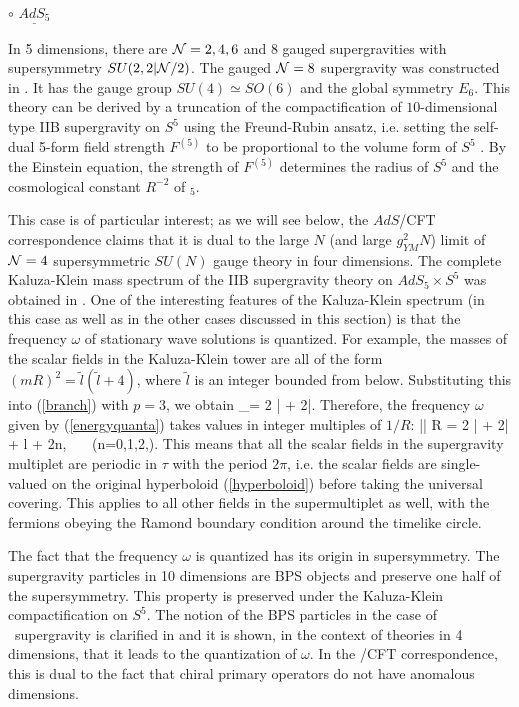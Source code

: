 \medskip
\noindent
$\circ$ $\underline{AdS_5}$

In 5 dimensions, there are ${\cal N} = 2,4,6$ and $8$ gauged
supergravities with supersymmetry $SU(2,2|{\cal N}/2)$.
The gauged ${\cal N}=8$ supergravity was constructed 
in \cite{Pernici:1985ju,Gunaydin:1986cu}. 
It has the gauge group $SU(4) \simeq SO(6)$ and
the global symmetry $E_6$. 
This theory can be
derived by a truncation of the
compactification of $10$-dimensional type IIB
supergravity on $S^5$ using the Freund-Rubin ansatz, i.e.
setting the self-dual 5-form field strength $F^{(5)}$ 
to be proportional to the volume form of $S^5$
\cite{Schwarz:1983qr,Gunaydin:1985fk,Kim:1985ez}. By the Einstein equation,
the strength of $F^{(5)}$ determines the radius of $S^5$
and the cosmological constant $R^{-2}$ of \ads$_5$.

This case is of particular interest; as we will see below,
the $AdS$/CFT correspondence claims that 
it is dual to the large $N$ (and large $g_{YM}^2 N$) limit of 
${\cal N}=4$ supersymmetric $SU(N)$ gauge theory in four dimensions. 
The complete Kaluza-Klein mass spectrum of
the IIB supergravity theory on $AdS_5 \times S^5$ was obtained in 
\cite{Gunaydin:1985fk,Kim:1985ez}.
One of the interesting features
of the Kaluza-Klein spectrum (in this case as well as in the other
cases discussed in this section) is that the frequency $\omega$ of
stationary wave solutions is quantized. For example, the masses of the
scalar fields in the Kaluza-Klein tower are all of the form
$(m R)^2  = \tilde{l}(\tilde{l} + 4)$, where $\tilde{l}$ is
an integer bounded from below. Substituting this into (\ref{branch})
with $p=3$, we obtain
\beq
 \lambda_\pm = 2 \pm | + 2|.
\eeq
Therefore, the frequency $\omega$ given by (\ref{energyquanta})
takes values in integer multiples of $1/R$: 
\beq
  |\omega| R = 2 \pm |  + 2| + l + 2n, ~~~(n=0,1,2,\cdots).
\eeq
This means that all the scalar fields in the supergravity
multiplet are periodic in $\tau$ with the period $2\pi$, i.e.
the scalar fields are single-valued on the original hyperboloid
(\ref{hyperboloid}) before taking the universal covering. 
This applies to all other fields in the supermultiplet as well,
with the fermions obeying the Ramond boundary condition around
the timelike circle. 

The fact that the frequency $\omega$ is quantized has its origin
in supersymmetry. The supergravity particles in 10 dimensions
are BPS objects and preserve one half of the supersymmetry.
This property is preserved under the Kaluza-Klein
compactification on $S^5$. The notion of the BPS particles in the case
of \ads\ supergravity is clarified in \cite{Freedman:1984na} 
and it is shown, in the context of theories in
4 dimensions, that it leads to the
quantization of $\omega$. In the \ads/CFT correspondence, 
this is dual to the fact that chiral primary operators
do not have  anomalous dimensions. 

